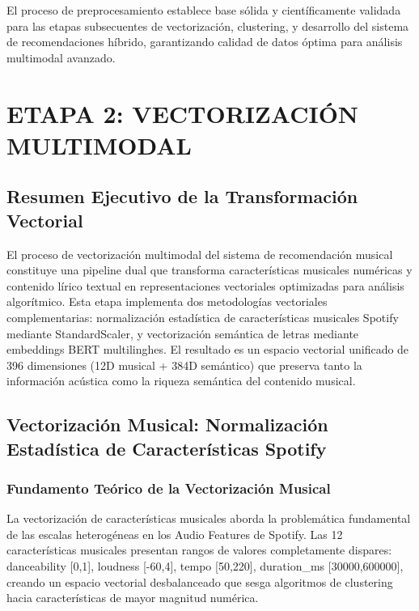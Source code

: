 \documentclass[12pt,a4paper]{report}
\begin{document}
El proceso de preprocesamiento establece base sólida y científicamente validada para las etapas subsecuentes de vectorización, clustering, y desarrollo del sistema de recomendaciones híbrido, garantizando calidad de datos óptima para análisis multimodal avanzado.

\chapter{ETAPA 2: VECTORIZACIÓN MULTIMODAL}
\label{chap:vectorizacion}

\section{Resumen Ejecutivo de la Transformación Vectorial}

El proceso de vectorización multimodal del sistema de recomendación musical constituye una pipeline dual que transforma características musicales numéricas y contenido lírico textual en representaciones vectoriales optimizadas para análisis algorítmico. Esta etapa implementa dos metodologías vectoriales complementarias: normalización estadística de características musicales Spotify mediante StandardScaler, y vectorización semántica de letras mediante embeddings BERT multilinghes. El resultado es un espacio vectorial unificado de 396 dimensiones (12D musical + 384D semántico) que preserva tanto la información acústica como la riqueza semántica del contenido musical.

\section{Vectorización Musical: Normalización Estadística de Características Spotify}

\subsection{Fundamento Teórico de la Vectorización Musical}

La vectorización de características musicales aborda la problemática fundamental de las escalas heterogéneas en los Audio Features de Spotify. Las 12 características musicales presentan rangos de valores completamente dispares: danceability [0,1], loudness [-60,4], tempo [50,220], duration\_ms [30000,600000], creando un espacio vectorial desbalanceado que sesga algoritmos de clustering hacia características de mayor magnitud numérica.
\end{document}
